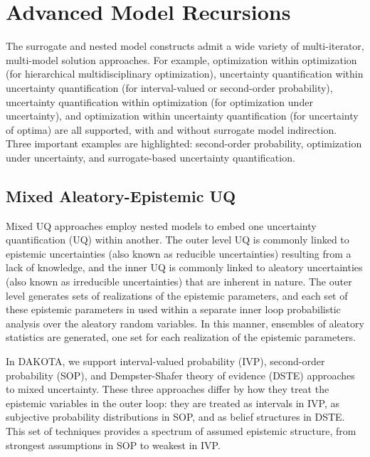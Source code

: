 \chapter{Advanced Model Recursions} \label{adv_models}


The surrogate and nested model constructs admit a wide variety of
multi-iterator, multi-model solution approaches.  For example,
optimization within optimization (for hierarchical multidisciplinary
optimization), uncertainty quantification within uncertainty
quantification (for interval-valued or second-order probability), uncertainty
quantification within optimization (for optimization under
uncertainty), and optimization within uncertainty quantification (for
uncertainty of optima) are all supported, with and without surrogate
model indirection.  Three important examples are highlighted:
second-order probability, optimization under uncertainty, and surrogate-based
uncertainty quantification.

\section{Mixed Aleatory-Epistemic UQ} \label{adv_models:mixed_uq}

Mixed UQ approaches employ nested models to embed one uncertainty
quantification (UQ) within another.  The outer level UQ is commonly
linked to epistemic uncertainties (also known as reducible
uncertainties) resulting from a lack of knowledge, and the inner UQ is
commonly linked to aleatory uncertainties (also known as irreducible
uncertainties) that are inherent in nature. The outer level generates
sets of realizations of the epistemic parameters, and each set of
these epistemic parameters in used within a separate inner loop
probabilistic analysis over the aleatory random variables.  In this
manner, ensembles of aleatory statistics are generated, one set for
each realization of the epistemic parameters.  %

In DAKOTA, we support interval-valued probability (IVP), second-order
probability (SOP), and Dempster-Shafer theory of evidence (DSTE)
approaches to mixed uncertainty.  These three approaches differ by how
they treat the epistemic variables in the outer loop: they are treated
as intervals in IVP, as subjective probability distributions in SOP,
and as belief structures in DSTE.  This set of techniques provides a
spectrum of assumed epistemic structure, from strongest assumptions in
SOP to weakest in IVP.

